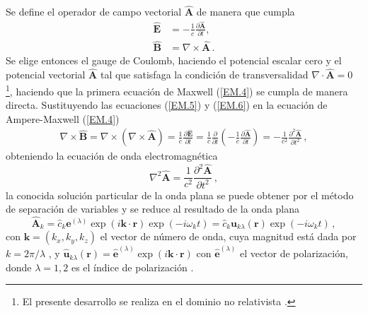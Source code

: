 Se define el operador de campo vectorial $\hat{\mathbf{A}}$ de manera que cumpla
\begin{align}
  \hat{\mathbf{E}} & = -\frac{1}{c}\frac{\partial \hat{\mathbf{A}}}{\partial t}, \label{EM.5} \\
  \hat{\mathbf{B}} & = \nabla \times \hat{\mathbf{A}}\,.\label{EM.6}
\end{align}
Se elige entonces el gauge de Coulomb, haciendo el potencial escalar cero y el potencial vectorial $\hat{\mathbf{A}}$ tal que satisfaga la condición de transversalidad $\nabla \cdot \hat{\mathbf{A}} = 0$ \footnote{El presente desarrollo se realiza en el dominio no relativista \cite{Agarwal_2012}.}, haciendo que la primera ecuación de Maxwell (\ref{EM.4}) se cumpla de manera directa. Sustituyendo las ecuaciones (\ref{EM.5}) y (\ref{EM.6})
en la ecuaci\'on de Ampere-Maxwell (\ref{EM.4})
\begin{align}
  \label{EM.7}
  \nabla \times \hat{\mathbf{B}} = \nabla \times \left(\nabla\times\hat{\mathbf{A}}\right)
  =\frac{1}{c}\frac{\partial \hat{\mathbf{E}}}{\partial t} = \frac{1}{c}\frac{\partial}{\partial t} \left(-\frac{1}{c}\frac{\partial\hat{\mathbf{A}}}{\partial t}\right) = -\frac{1}{c^{2}}\frac{\partial^{2}\hat{\mathbf{A}}}{\partial t^{2}} \,,
\end{align}
obteniendo la ecuación de onda electromagnética
\begin{equation}
  \label{EM.8}
  \nabla^2 \hat{\mathbf{A}} = \frac{1}{c^2} \frac{\partial^2 \hat{\mathbf{A}}}{\partial t^2}\,,
\end{equation}
la conocida solución particular de la onda plana se puede obtener por el método de separación de variables y se reduce al resultado de la onda plana
\begin{equation}
  \label{EM.9}
  \hat{\mathbf{A}}_k = \hat{c}_k \mathbf{e}^{(\lambda)}\exp{(i\mathbf{k}\cdot \mathbf{r})}\exp{(-i\omega_k t)} = \hat{c}_{k}\mathbf{u}_{k\lambda}(\mathbf{r}) \exp{(-i\omega_k t)} \,,
\end{equation}
con $\mathbf{k} = (k_x, k_y, k_z)$ el vector de número de onda, cuya magnitud está dada por $k = 2\pi/\lambda$ \cite{Riley}, y $\hat{\mathbf{u}}_{k\lambda}(\mathbf{r}) = \hat{\mathbf{e}}^{(\lambda)} \exp{(i\mathbf{k}\cdot \mathbf{r})}$ con $\hat{\mathbf{e}}^{(\lambda)}$ el vector de polarización, donde $\lambda=1,2$ es el índice de polarización \cite{Walls}.

